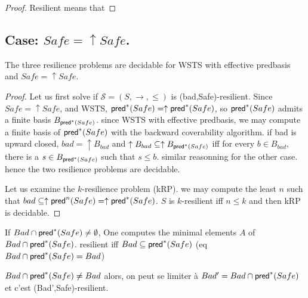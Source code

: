\begin{proof}
Resilient means that 
\end{proof}


\subsection{Case: $Safe=\uparrow Safe$.}


\begin{theorem}\label{up-down}
The three %
resilience problems are decidable for WSTS with effective predbasis and $Safe=\uparrow Safe$.
\end{theorem}


\begin{proof}
Let us first solve if $\mathscr{S}=(S,\rightarrow,\leq)$ is %
(bad,Safe)-resilient. Since $Safe=\uparrow Safe$, and WSTS, $\textsf{pred}^*(Safe)=\uparrow \textsf{pred}^*(Safe)$, so $\textsf{pred}^*(Safe)$ admits a finite basis $B_{\textsf{pred}^*(Safe)}$. since WSTS  with effective predbasis, we may compute a finite basis of $\textsf{pred}^*(Safe)$ with the backward coverability algorithm. 
if bad  is upward closed, $bad = \uparrow B_{bad}$ and $ \uparrow B_{bad} \subseteq \uparrow B_{\textsf{pred}^*(Safe)}$ iff for every $b \in B_{bad}$, there is a $s \in B_{\textsf{pred}^*(Safe)}$ such that $s \leq b$. similar reasonning for the other case.
hence the two %
 resilience problems are decidable.

Let us examine the %
$k$-resilience problem (kRP). we may compute the least $n$ such that $bad \subseteq \uparrow \textsf{pred}^n(Safe)=  \uparrow \textsf{pred}^*(Safe)$. $S$ is %
$k$-resilient iff $n \leq k$ and then kRP is decidable.
\end{proof}


If $Bad \cap \textsf{pred}^*(Safe) \neq \emptyset$, One computes the minimal elements $A$ of $Bad \cap \textsf{pred}^*(Safe)$.
resilient iff $Bad \subseteq \textsf{pred}^*(Safe)$  (eq $Bad \cap \textsf{pred}^*(Safe) = Bad$)

$Bad \cap \textsf{pred}^*(Safe) \neq Bad$ alors, on peut se limiter à $Bad' = Bad \cap \textsf{pred}^*(Safe)$ et c'est (Bad',Safe)-resilient.

